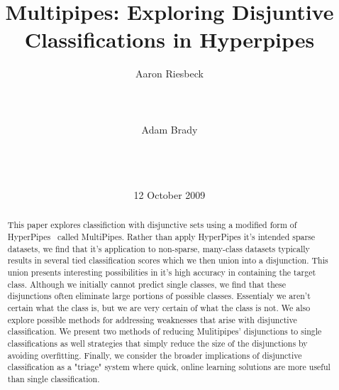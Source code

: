 \documentclass{acm_proc_article-sp}
\begin{document}
\title{Multipipes: Exploring Disjuntive Classifications in Hyperpipes}

%
\author{
%
\alignauthor
Aaron Riesbeck\\
       \\
       \\
       \\
\alignauthor
Adam Brady\\
       \\
       \\
       \\
}
\date{12 October 2009}

\maketitle
\begin{abstract}

This paper explores classifiction with disjunctive sets using a modified form of HyperPipes~\cite{Eisenstein04} called MultiPipes. Rather than apply HyperPipes it's intended sparse datasets, we find that it's application to non-sparse, many-class datasets typically results in several tied classification scores which we then union into a disjunction. This union presents interesting possibilities in it's high accuracy in containing the target class. Although we initially cannot predict single classes, we find that these disjunctions often eliminate large portions of possible classes. Essentialy we aren't certain what the class is, but we are very certain of what the class is not. We also explore possible methods for addressing weaknesses that arise with disjunctive classification. We present two methods of reducing Mulitipipes' disjunctions to single classifications as well strategies that simply reduce the size of the disjunctions by avoiding overfitting. Finally, we consider the broader implications of disjunctive classification as a "triage" system where quick, online learning solutions are more useful than single classification.

\end{abstract}
\end{document}
